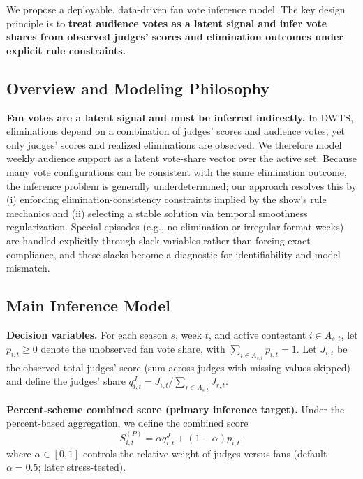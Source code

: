 We propose a deployable, data-driven fan vote inference model. The key design principle is to \textbf{treat audience votes as a latent signal and infer vote shares from observed judges' scores and elimination outcomes under explicit rule constraints.}

\subsection{Overview and Modeling Philosophy}\label{subsec:model_philosophy}

\textbf{Fan votes are a latent signal and must be inferred indirectly.}
In DWTS, eliminations depend on a combination of judges' scores and audience votes, yet only judges' scores and realized eliminations are observed.
We therefore model weekly audience support as a latent vote-share vector over the active set.
Because many vote configurations can be consistent with the same elimination outcome, the inference problem is generally underdetermined; our approach resolves this by
(i) enforcing elimination-consistency constraints implied by the show's rule mechanics and
(ii) selecting a stable solution via temporal smoothness regularization.\cite{benning2018regularization,kaipio2005statistical}
Special episodes (e.g., no-elimination or irregular-format weeks) are handled explicitly through slack variables rather than forcing exact compliance, and these slacks become a diagnostic for identifiability and model mismatch.

\subsection{Main Inference Model}\label{subsec:inference_model}
\textbf{Decision variables.}
For each season $s$, week $t$, and active contestant $i\in A_{s,t}$, let $p_{i,t}\ge 0$ denote the unobserved fan vote share, with $\sum_{i\in A_{s,t}}p_{i,t}=1$.
Let $J_{i,t}$ be the observed total judges' score (sum across judges with missing values skipped) and define the judges' share
$q^J_{i,t}=J_{i,t}\big/\sum_{r\in A_{s,t}}J_{r,t}$.

\textbf{Percent-scheme combined score (primary inference target).}
Under the percent-based aggregation, we define the combined score
\begin{equation}
S^{(P)}_{i,t}=\alpha q^{J}_{i,t}+(1-\alpha)p_{i,t},
\end{equation}
where $\alpha\in[0,1]$ controls the relative weight of judges versus fans (default $\alpha=0.5$; later stress-tested).

